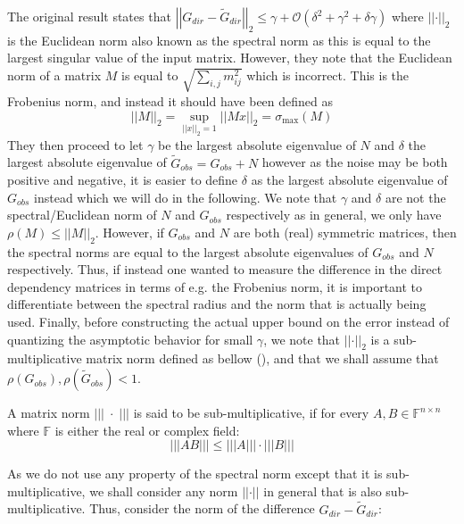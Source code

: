 \documentclass[../Thesis.tex]{subfiles}
\begin{document}
The original result states that $\left|\left| G_{dir} - \tilde{G}_{dir} \right|\right|_2 \leq \gamma + \mathcal{O}\left( \delta^2 + \gamma^2 + \delta \gamma\right)$ where $\left|\left| \cdot \right|\right|_2$ is the Euclidean norm also known as the spectral norm as this is equal to the largest singular value of the input matrix. However, they note that the Euclidean norm of a matrix $M$ is equal to $\sqrt{\sum_{i,j} m_{ij}^2}$ which is incorrect. This is the Frobenius norm, and instead it should have been defined as
$$\left|\left| M \right|\right|_2 = \sup_{\left|\left| x \right|\right|_2 = 1} \left|\left| Mx \right|\right|_2 = \sigma_{\max}\left(M\right)$$
They then proceed to let $\gamma$ be the largest absolute eigenvalue of $N$ and $\delta$ the largest absolute eigenvalue of $\tilde{G}_{obs} = G_{obs} + N$ however as the noise may be both positive and negative, it is easier to define $\delta$ as the largest absolute eigenvalue of $G_{obs}$ instead which we will do in the following. We note that $\gamma$ and $\delta$ are not the spectral/Euclidean norm of $N$ and $G_{obs}$ respectively as in general, we only have $\rho\left(M\right) \leq \left|\left| M \right|\right|_2$. However, if $G_{obs}$ and $N$ are both (real) symmetric matrices, then the spectral norms are equal to the largest absolute eigenvalues of $G_{obs}$ and $N$ respectively. Thus, if instead one wanted to measure the difference in the direct dependency matrices in terms of e.g. the Frobenius norm, it is important to differentiate between the spectral radius and the norm that is actually being used. Finally, before constructing the actual upper bound on the error instead of quantizing the asymptotic behavior for small $\gamma$, we note that $\left|\left| \cdot \right|\right|_2$ is a sub-multiplicative matrix norm defined as bellow (\cite{MATRIX_ANALYSIS-Horn_Johnson_2012}), and that we shall assume that $\rho\left(G_{obs}\right), \rho\left(\tilde{G}_{obs}\right) < 1$.
\begin{definition}\label{def:sub-multiplicative matrix norm}
    A matrix norm $\left|\left|\left| \; \cdot \; \right|\right|\right|$ is said to be sub-multiplicative, if for every $A,B \in \mathbb{F}^{n\times n}$ where $\mathbb{F}$ is either the real or complex field:
    $$\left|\left|\left| AB\right|\right|\right| \leq \left|\left|\left| A \right|\right|\right|\cdot \left|\left|\left| B \right|\right|\right|$$
\end{definition}
As we do not use any property of the spectral norm except that it is sub-multiplicative, we shall consider any norm $\left|\left| \cdot \right|\right|$ in general that is also sub-multiplicative. Thus, consider the norm of the difference $G_{dir} - \tilde{G}_{dir}$:
\end{document}
